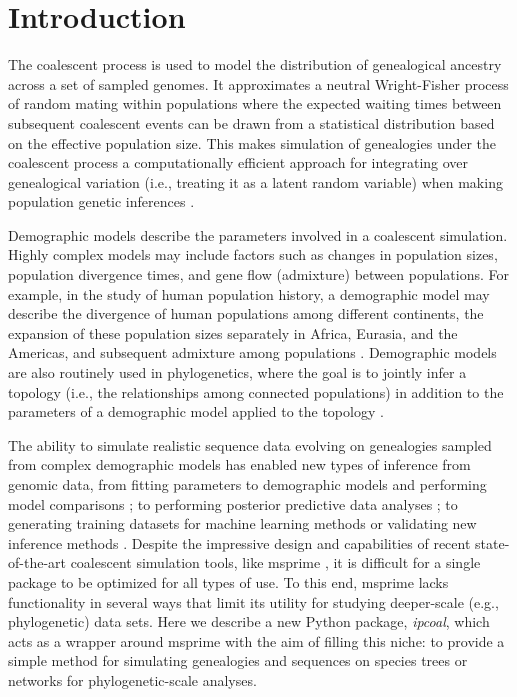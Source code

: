 \documentclass[11pt]{article}
\begin{document}
\RaggedRight
\bigskip

\section{Introduction}
The coalescent process \citep{kingman_coalescent_1982,hudson_testing_1983} is used to model the distribution of genealogical ancestry across a set of sampled genomes. It approximates a neutral Wright-Fisher process of random mating within populations where the expected waiting times between subsequent coalescent events can be drawn from a statistical distribution based on the effective population size. This makes simulation of genealogies under the coalescent process \citep{hudson_generating_2002} a computationally efficient approach for integrating over genealogical variation (i.e., treating it as a latent random variable) when making population genetic inferences \citep{beerli_coalescent_2001}. 

Demographic models describe the parameters involved in a coalescent simulation. Highly complex models may include factors such as changes in population sizes, population divergence times, and gene flow (admixture) between populations. For example, in the study of human population history, a demographic model may describe the divergence of human populations among different continents, the expansion of these population sizes separately in Africa, Eurasia, and the Americas, and subsequent admixture among populations \citep{reich_who_2018,green_neandertal_2010,gronau_demography_2011}. Demographic models are also routinely used in phylogenetics, where the goal is to jointly infer a topology (i.e., the relationships among connected populations) in addition to the parameters of a demographic model applied to the topology \citep{degnan_gene_2009,knowles_estimating_2011}. 

The ability to simulate realistic sequence data evolving on genealogies sampled from complex demographic models has enabled new types of inference from genomic data, from fitting parameters to demographic models and performing model comparisons \citep{chung_bayesian_2017}; to performing posterior predictive data analyses \citep{brown_predictive_2014}; to generating training datasets for machine learning methods \citep{schrider_learning_2017} or validating new inference methods \citep{adrion_community_maintained_2019}. Despite the impressive design and capabilities of recent state-of-the-art coalescent simulation tools, like msprime \citep{kelleher_efficient_2016}, it is difficult for a single package to be optimized for all types of use. To this end, msprime lacks functionality in several ways that limit its utility for studying deeper-scale (e.g., phylogenetic) data sets. Here we describe a new Python package, \emph{ipcoal}, which acts as a wrapper around msprime with the aim of filling this niche: to provide a simple method for simulating genealogies and sequences on species trees or networks for phylogenetic-scale analyses.
\end{document}
